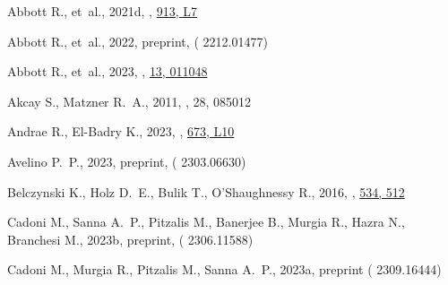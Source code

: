 \documentclass[fleqn,usenatbib,useAMS]{mnras}
\begin{document}
\begin{thebibliography}{}
Abbott R.,  et~al., 2021d, , \href {https://ui.adsabs.harvard.edu/abs/2021ApJ...913L...7A} {913, L7}

Abbott R.,  et~al., 2022, preprint, \href {https://ui.adsabs.harvard.edu/abs/2022arXiv221201477T} {} ( {2212.01477})

Abbott R.,  et~al., 2023, , \href {https://ui.adsabs.harvard.edu/abs/2023PhRvX..13a1048A} {13, 011048}

Akcay S.,  Matzner R.~A.,  2011, , 28, 085012

Andrae R.,  El-Badry K.,  2023, , \href {https://ui.adsabs.harvard.edu/abs/2023A&A...673L..10A} {673, L10}

Avelino P.~P.,  2023, preprint, \href {https://ui.adsabs.harvard.edu/abs/2023arXiv230306630A} {} ( {2303.06630})

Belczynski K.,  Holz D.~E.,  Bulik T.,   O'Shaughnessy R.,  2016, , \href {https://ui.adsabs.harvard.edu/abs/2016Natur.534..512B} {534, 512}

Cadoni M.,  Sanna A.~P.,  Pitzalis M.,  Banerjee B.,  Murgia R.,  Hazra N.,   Branchesi M.,  2023b, preprint, \href {https://ui.adsabs.harvard.edu/abs/2023arXiv230611588C} {} ( {2306.11588})

Cadoni M.,  Murgia R.,  Pitzalis M.,   Sanna A.~P.,  2023a, preprint ( {2309.16444})


\end{thebibliography}
\end{document}
